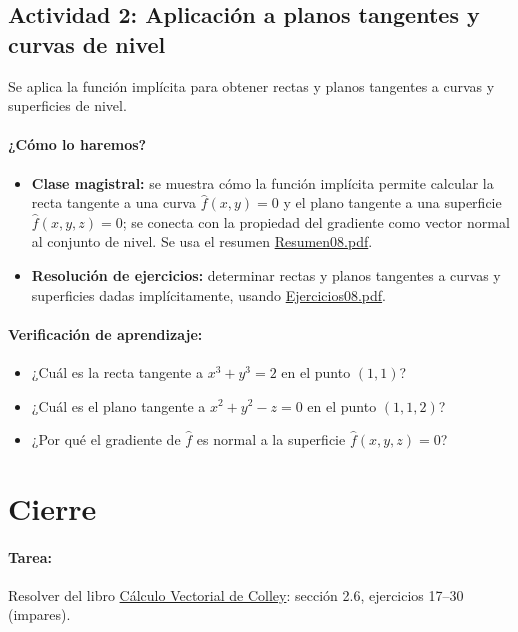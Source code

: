 \documentclass[a4,11pt]{aleph-notas}
\begin{document}
\subsection*{Actividad 2: Aplicación a planos tangentes y curvas de nivel}
Se aplica la función implícita para obtener rectas y planos tangentes a curvas y superficies de nivel.

\paragraph{¿Cómo lo haremos?}
\begin{itemize}[leftmargin=*]
    \item \textbf{Clase magistral:} se muestra cómo la función implícita permite calcular la recta tangente a una curva $\hat{f}(x,y)=0$ y el plano tangente a una superficie $\hat{f}(x,y,z)=0$; se conecta con la propiedad del gradiente como vector normal al conjunto de nivel. Se usa el resumen \href{https://andres-merino.github.io/MatematicaIII-05-N0051/01Resumen/Resumen08.pdf}{Resumen08.pdf}.
    \item \textbf{Resolución de ejercicios:} determinar rectas y planos tangentes a curvas y superficies dadas implícitamente, usando \href{https://andres-merino.github.io/MatematicaIII-05-N0051/04Ejercicios/Ejercicios08.pdf}{Ejercicios08.pdf}.
\end{itemize}

\paragraph{Verificación de aprendizaje:}
\begin{itemize}[leftmargin=*]
    \item ¿Cuál es la recta tangente a $x^3+y^3=2$ en el punto $(1,1)$?
    \item ¿Cuál es el plano tangente a $x^2+y^2-z=0$ en el punto $(1,1,2)$?
    \item ¿Por qué el gradiente de $\hat{f}$ es normal a la superficie $\hat{f}(x,y,z)=0$?
\end{itemize}

\section*{Cierre}

\paragraph{Tarea:}
Resolver del libro \href{https://catalogobiblioteca.puce.edu.ec/cgi-bin/koha/opac-detail.pl?biblionumber=83405&query_desc=su%3A%22An%C3%A1lisis%20vectorial%22}{Cálculo Vectorial de Colley}: sección 2.6, ejercicios 17--30 (impares).
\end{document}
